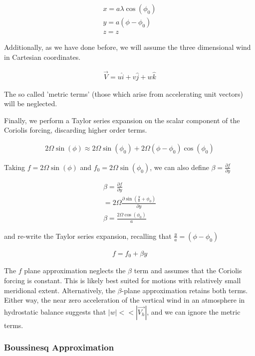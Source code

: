 \documentclass[a4paper,12pt]{article}
\begin{document}
\begin{align}
x = a\lambda \cos(\phi_0)\\
y = a(\phi-\phi_0)\\
z = z
\end{align}

Additionally, as we have done before, we will assume the three dimensional wind in Cartesian coordinates.

\begin{align}
\vec{V} = u\hat{i} + v\hat{j} + w\hat{k}
\end{align}

The so called 'metric terms' (those which arise from accelerating unit vectors) will be neglected.

Finally, we perform a Taylor series expansion on the scalar component of the Coriolis forcing, discarding higher order terms.

\begin{align}
2\Omega\sin(\phi) \approx 2\Omega\sin(\phi_0) + 2\Omega(\phi-\phi_0)\cos(\phi_0)
\end{align}

Taking $f = 2\Omega\sin(\phi)$ and $f_0 = 2\Omega\sin(\phi_0)$, we can also define $\beta = \frac{\partial f}{\partial y}$

\begin{align}
\beta = \frac{\partial f}{\partial y}\\
= 2\Omega\frac{\partial\sin(\frac{y}{a}+\phi_0)}{\partial y}\\
\beta = \frac{2\Omega\cos(\phi_0)}{a}
\end{align}

and re-write the Taylor series expansion, recalling that $\frac{y}{a} = (\phi-\phi_0)$

\begin{align}
f = f_0 + \beta y
\end{align}

The $f$ plane approximation neglects the $\beta$ term and assumes that the Coriolis forcing is constant. This is likely best suited for motions with relatively small meridional extent. Alternatively, the $\beta$-plane approximation retains both terms. Either way, the near zero acceleration of the vertical wind in an atmosphere in hydrostatic balance suggests that $|w| << |\vec{V_h}|$, and we can ignore the metric terms.

\subsubsection*{Boussinesq Approximation}
\end{document}
